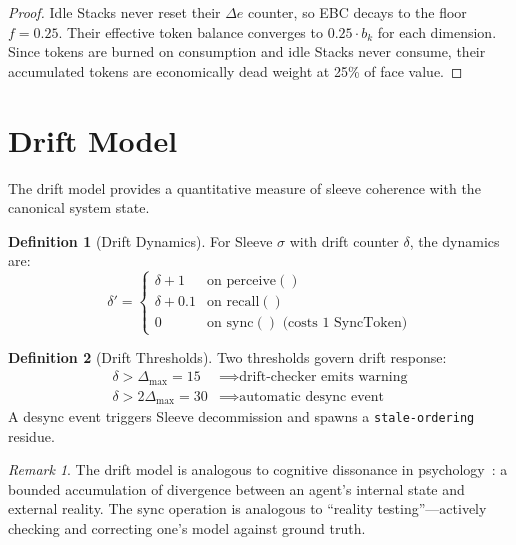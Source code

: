 \documentclass[11pt,twocolumn]{article}
\theoremstyle{definition}
\newtheorem{definition}{Definition}[section]
\theoremstyle{plain}
\theoremstyle{remark}
\newtheorem{remark}{Remark}[section]
\begin{document}
\begin{proof}
Idle Stacks never reset their $\Delta e$ counter, so EBC decays to the floor $f = 0.25$. Their effective token balance converges to $0.25 \cdot b_k$ for each dimension. Since tokens are burned on consumption and idle Stacks never consume, their accumulated tokens are economically dead weight at 25\% of face value.
\end{proof}

\section{Drift Model}\label{sec:drift}

The drift model provides a quantitative measure of sleeve coherence with the canonical system state.

\begin{definition}[Drift Dynamics]\label{def:drift}
For Sleeve $\sigma$ with drift counter $\delta$, the dynamics are:
\begin{equation}\label{eq:drift}
  \delta' = \begin{cases}
    \delta + 1 & \text{on } \mathrm{perceive}()\\
    \delta + 0.1 & \text{on } \mathrm{recall}()\\
    0 & \text{on } \mathrm{sync}() \text{ (costs 1 SyncToken)}
  \end{cases}
\end{equation}
\end{definition}

\begin{definition}[Drift Thresholds]\label{def:drift-thresholds}
Two thresholds govern drift response:
\begin{align}
  \delta > \Delta_{\max} = 15 &\implies \text{drift-checker emits warning}\\
  \delta > 2\Delta_{\max} = 30 &\implies \text{automatic desync event}
\end{align}
A desync event triggers Sleeve decommission and spawns a \texttt{stale-ordering} residue.
\end{definition}

\begin{remark}
The drift model is analogous to cognitive dissonance in psychology~\cite{festinger1957cognitive}: a bounded accumulation of divergence between an agent's internal state and external reality. The sync operation is analogous to ``reality testing''---actively checking and correcting one's model against ground truth.
\end{remark}
\end{document}
